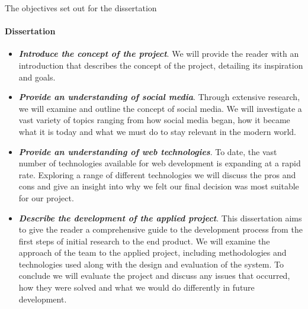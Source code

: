 The objectives set out for the dissertation 
\paragraph{Dissertation}
\begin{itemize}
\item \textit{\textbf{Introduce the concept of the project}}. We will provide the reader with an introduction that describes the concept of the project, detailing its inspiration and goals.
\item \textit{\textbf{Provide an understanding of social media}}. Through extensive research, we will examine and outline the concept of social media. We will investigate a vast variety of topics ranging from how social media began, how it became what it is today and what we must do to stay relevant in the modern world.
\item \textit{\textbf{Provide an understanding of web technologies}}. To date, the vast number of technologies available for web development is expanding at a rapid rate. Exploring a range of different technologies we will discuss the pros and cons and give an insight into why we felt our final decision was most suitable for our project.
\item \textit{\textbf{Describe the development of the applied project}}. This dissertation aims to give the reader a comprehensive guide to the development process from the first steps of initial research to the end product. We will examine the approach of the team to the applied project, including methodologies and technologies used along with the design and evaluation of the system. To conclude we will evaluate the project and discuss any issues that occurred, how they were solved and what we would do differently in future development.
\end{itemize}
 
